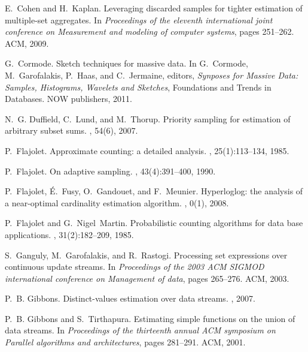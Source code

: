 \documentclass{article}
\begin{document}
\begin{thebibliography}{10}
E.~Cohen and H.~Kaplan.
\newblock Leveraging discarded samples for tighter estimation of multiple-set
  aggregates.
\newblock In {\em Proceedings of the eleventh international joint conference on
  Measurement and modeling of computer systems}, pages 251--262. ACM, 2009.

G.~Cormode.
\newblock Sketch techniques for massive data.
\newblock In G.~Cormode, M.~Garofalakis, P.~Haas, and C.~Jermaine, editors,
  {\em Synposes for Massive Data: Samples, Histograms, Wavelets and Sketches},
  Foundations and Trends in Databases. NOW publishers, 2011.

N.~G. Duffield, C.~Lund, and M.~Thorup.
\newblock Priority sampling for estimation of arbitrary subset sums.
, 54(6), 2007.

P.~Flajolet.
\newblock Approximate counting: a detailed analysis.
, 25(1):113--134, 1985.

P.~Flajolet.
\newblock On adaptive sampling.
, 43(4):391--400, 1990.

P.~Flajolet, {\'E}.~Fusy, O.~Gandouet, and F.~Meunier.
\newblock Hyperloglog: the analysis of a near-optimal cardinality estimation
  algorithm.
, 0(1), 2008.

P.~Flajolet and G.~Nigel~Martin.
\newblock Probabilistic counting algorithms for data base applications.
, 31(2):182--209, 1985.

S.~Ganguly, M.~Garofalakis, and R.~Rastogi.
\newblock Processing set expressions over continuous update streams.
\newblock In {\em Proceedings of the 2003 ACM SIGMOD international conference
  on Management of data}, pages 265--276. ACM, 2003.

P.~B. Gibbons.
\newblock Distinct-values estimation over data streams.
,
  2007.

P.~B. Gibbons and S.~Tirthapura.
\newblock Estimating simple functions on the union of data streams.
\newblock In {\em Proceedings of the thirteenth annual ACM symposium on
  Parallel algorithms and architectures}, pages 281--291. ACM, 2001.


\end{thebibliography}
\end{document}
